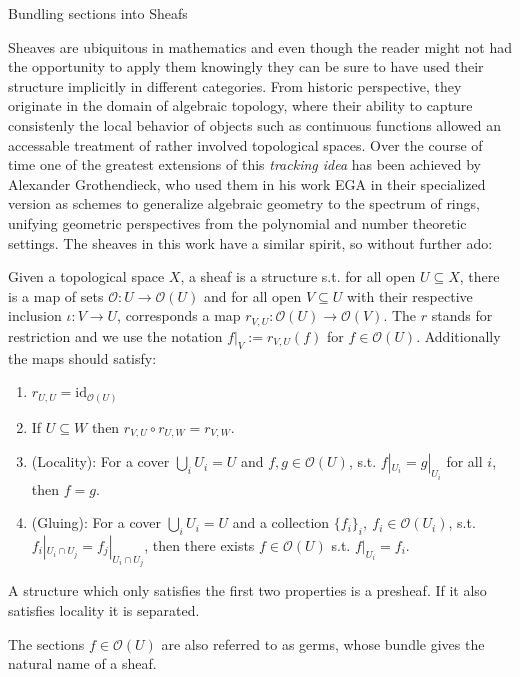 \begin{subsection}{Bundling sections into Sheafs}
    
Sheaves are ubiquitous in mathematics and even though the reader might not had the opportunity
to apply them knowingly they can be sure to have used their structure implicitly in different categories.
From historic perspective, they originate in the domain of algebraic topology, where their ability to capture
consistenly the local behavior of objects such as continuous functions allowed an accessable
treatment of rather involved topological spaces. Over the course of time one of the greatest 
extensions of this \textit{tracking idea} has been achieved by Alexander Grothendieck, who used
them in his work EGA \cite{egatransl} in their specialized version as schemes to generalize algebraic geometry to the spectrum 
of rings, unifying geometric perspectives from the polynomial and number theoretic settings.
The sheaves in this work have a similar spirit, so without further ado:

\begin{definition}
    Given a topological space \( X \), a sheaf is a structure s.t. 
    for all open \( U \subseteq X \), there is a map of sets \( \mathcal{O} : U \to \mathcal{O}(U) \) 
    and for all open \( V \subseteq U \) with their respective inclusion \( \iota : V \to U  \),
    corresponds a map \( r_{V, U} : \mathcal{O}(U) \to \mathcal{O}(V) \).
    The \( r \) stands for restriction and we use the notation \( f|_V := r_{V, U}(f) \) for \( f \in \mathcal{O}(U) \). Additionally 
    the maps should satisfy:
    \begin{enumerate}
        \item \( r_{U, U} = \text{id}_{\mathcal{O}(U)} \)
        \item If \( U \subseteq W \) then \( r_{V,U} \circ r_{U,W} = r_{V,W} \).
        \item (Locality): For a cover \( \bigcup_i U_i = U \) and  \( f, g \in \mathcal{O}(U) \), s.t. \( f|_{U_i} = g|_{U_i} \) 
            for all \( i \), then \( f = g \).
        \item (Gluing): For a cover \( \bigcup_i U_i = U \) and a collection \( \{ f_i \}_i,\ f_i \in \mathcal{O}(U_i) \), 
           s.t. \( f_i|_{U_i \cap U_j} = f_j|_{U_i \cap U_j} \), then there exists \( f \in \mathcal{O}(U) \)
           s.t. \( f|_{U_i} = f_i \).
    \end{enumerate}
    A structure which only satisfies the first two properties is a presheaf. If it also satisfies locality it is separated.
\end{definition} 
The sections \( f \in \mathcal{O}(U) \) are also referred to as germs, whose bundle gives the natural name of a sheaf.


\end{subsection}
